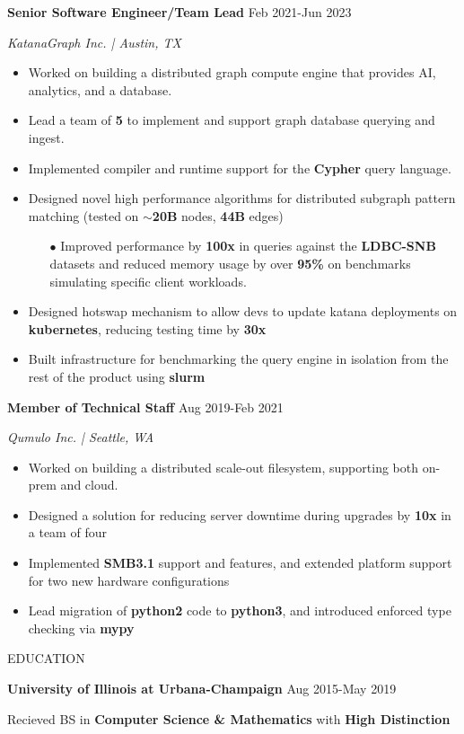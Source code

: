 \documentclass[paper=a4,fontsize=11pt]{scrartcl} %
\newcommand{\sepspace}{\vspace*{1em}}		%
\newcommand{\NewPart}[1]{ \noindent \large \usefont{OT1}{phv}{b}{n}\uppercase{#1} \normalfont \normalsize}
\newcommand{\EducationEntry}[4]{
		\noindent \textbf{#1}     %
			\hfill#2 \par  %
		\noindent \textit{#3} \par        %
		\noindent\hangafter=0 \small #4 %
		\normalsize \par}
\begin{document}
\EducationEntry{Senior Software Engineer/Team Lead}{Feb 2021-Jun 2023}{KatanaGraph Inc. | Austin, TX}{
\begin{itemize}
  \item Worked on building a distributed graph compute engine that provides AI, analytics, and a database.
  \item Lead a team of \textbf{5} to implement and support graph database querying and ingest.
  \item Implemented compiler and runtime support for the \textbf{Cypher} query language.
  \item Designed novel high performance algorithms for distributed subgraph pattern matching (tested on $\sim$\textbf{20B} nodes, \textbf{44B} edges)
  \begin{itemize}
    \item[$\bullet$] Improved performance by \textbf{100x} in queries against the \textbf{LDBC-SNB} datasets and reduced memory usage by over \textbf{95\%} on benchmarks simulating specific client workloads.
  \end{itemize}
  \item Designed hotswap mechanism to allow devs to update katana deployments on \textbf{kubernetes}, reducing testing time by \textbf{30x}
  \item Built infrastructure for benchmarking the query engine in isolation from the rest of the product using \textbf{slurm}
\end{itemize}
}

\EducationEntry{Member of Technical Staff}{Aug 2019-Feb 2021}{Qumulo Inc. | Seattle, WA}{
\begin{itemize}
  \item Worked on building a distributed scale-out filesystem, supporting both on-prem and cloud.
  \item Designed a solution for reducing server downtime during upgrades by \textbf{10x} in a team of four
  \item Implemented \textbf{SMB3.1} support and features, and extended platform support for two new hardware configurations
  \item Lead migration of \textbf{python2} code to \textbf{python3}, and introduced enforced type checking via \textbf{mypy}
\end{itemize}
}

\vspace{0.5em}
\NewPart{Education}{}\newline
\EducationEntry{\small University of Illinois at Urbana-Champaign\normalsize}{Aug 2015-May 2019}{}{
  \sepspace Recieved BS in \textbf{Computer Science \& Mathematics} with \textbf{High Distinction}}{}%
\end{document}
